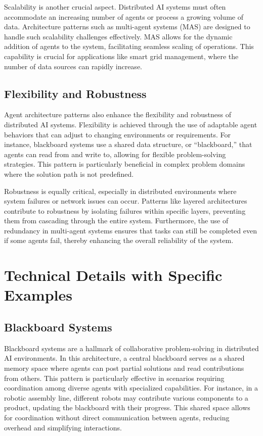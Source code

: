 \documentclass{article}
\begin{document}
Scalability is another crucial aspect. Distributed AI systems must often accommodate an increasing number of agents or process a growing volume of data. Architecture patterns such as multi-agent systems (MAS) are designed to handle such scalability challenges effectively. MAS allows for the dynamic addition of agents to the system, facilitating seamless scaling of operations. This capability is crucial for applications like smart grid management, where the number of data sources can rapidly increase.

\subsection{Flexibility and Robustness}
Agent architecture patterns also enhance the flexibility and robustness of distributed AI systems. Flexibility is achieved through the use of adaptable agent behaviors that can adjust to changing environments or requirements. For instance, blackboard systems use a shared data structure, or ``blackboard,'' that agents can read from and write to, allowing for flexible problem-solving strategies. This pattern is particularly beneficial in complex problem domains where the solution path is not predefined.

Robustness is equally critical, especially in distributed environments where system failures or network issues can occur. Patterns like layered architectures contribute to robustness by isolating failures within specific layers, preventing them from cascading through the entire system. Furthermore, the use of redundancy in multi-agent systems ensures that tasks can still be completed even if some agents fail, thereby enhancing the overall reliability of the system.

\section{Technical Details with Specific Examples}

\subsection{Blackboard Systems}
Blackboard systems are a hallmark of collaborative problem-solving in distributed AI environments. In this architecture, a central blackboard serves as a shared memory space where agents can post partial solutions and read contributions from others. This pattern is particularly effective in scenarios requiring coordination among diverse agents with specialized capabilities. For instance, in a robotic assembly line, different robots may contribute various components to a product, updating the blackboard with their progress. This shared space allows for coordination without direct communication between agents, reducing overhead and simplifying interactions.
\end{document}
